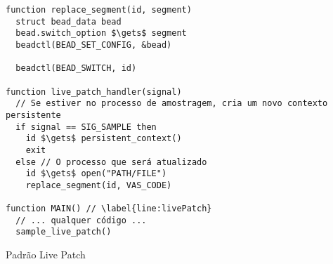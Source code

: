\begin{pseudocode}
\begin{lstlisting}[language=pseudocode, style=pseudocode]
function replace_segment(id, segment)
  struct bead_data bead
  bead.switch_option $\gets$ segment
  beadctl(BEAD_SET_CONFIG, &bead)

  beadctl(BEAD_SWITCH, id)

function live_patch_handler(signal)
  // Se estiver no processo de amostragem, cria um novo contexto persistente
  if signal == SIG_SAMPLE then
    id $\gets$ persistent_context()
    exit
  else // O processo que será atualizado
    id $\gets$ open("PATH/FILE")
    replace_segment(id, VAS_CODE)

function MAIN() // \label{line:livePatch}
  // ... qualquer código ...
  sample_live_patch()
\end{lstlisting}

  \label{alg:livePatch}
  \caption{Padrão Live Patch}
\end{pseudocode}
